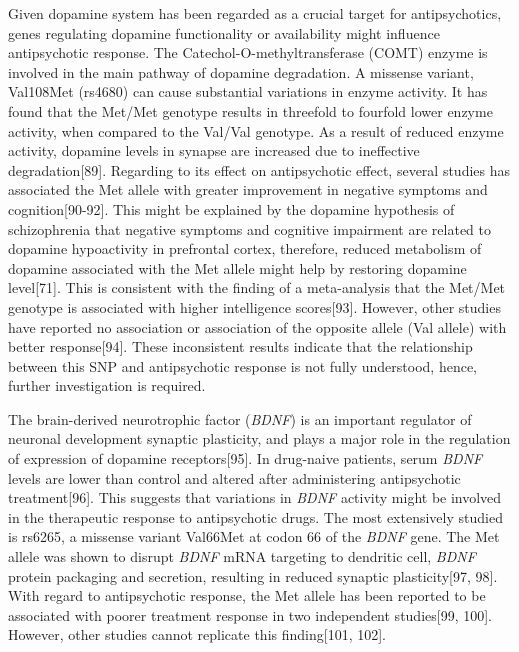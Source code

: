 \documentclass[12pt]{report}
\newcommand{\gene}[1]{\textit{#1}}
\begin{document}
				Given dopamine system has been regarded as a crucial target for antipsychotics, genes regulating dopamine functionality or availability might influence antipsychotic response. 
				The Catechol-O-methyltransferase (COMT) enzyme is involved in the main pathway of dopamine degradation. 
				A missense variant, Val108Met (rs4680) can cause substantial variations in enzyme activity. 
				It has found that the Met/Met genotype results in threefold to fourfold lower enzyme activity, when compared to the Val/Val genotype.  
				As a result of reduced enzyme activity, dopamine levels in synapse are increased due to ineffective degradation[89]. 
				Regarding to its effect on antipsychotic effect, several studies has associated the Met allele with greater improvement in negative symptoms and cognition[90-92]. 
				This might be explained by the dopamine hypothesis of schizophrenia that negative symptoms and cognitive impairment are related to dopamine hypoactivity in prefrontal cortex, therefore, reduced metabolism of dopamine associated with the Met allele might help by restoring dopamine level[71]. 
				This is consistent with the finding of a meta-analysis that the Met/Met genotype is associated with higher intelligence scores[93]. 
				However, other studies have reported no association or association of the opposite allele (Val allele) with better response[94]. 
				These inconsistent results indicate that the relationship between this SNP and antipsychotic response is not fully understood, hence, further investigation is required.
				 
				The brain-derived neurotrophic factor (\gene{BDNF}) is an important regulator of neuronal development synaptic plasticity, and plays a major role in the regulation of expression of dopamine receptors[95].
				In drug-naive patients, serum \gene{BDNF} levels are lower than control and altered after administering antipsychotic treatment[96]. 
				This suggests that variations in \gene{BDNF} activity might be involved in the therapeutic response to antipsychotic drugs.  
				The most extensively studied is rs6265, a missense variant Val66Met at codon 66 of the \gene{BDNF} gene.
				The Met allele was shown to disrupt \gene{BDNF} mRNA targeting to dendritic cell, \gene{BDNF} protein packaging and secretion, resulting in reduced synaptic plasticity[97, 98]. 
				With regard to antipsychotic response, the Met allele has been reported to be associated with poorer treatment response in two independent studies[99, 100]. 
				However, other studies cannot replicate this finding[101, 102]. 
				
\end{document}
